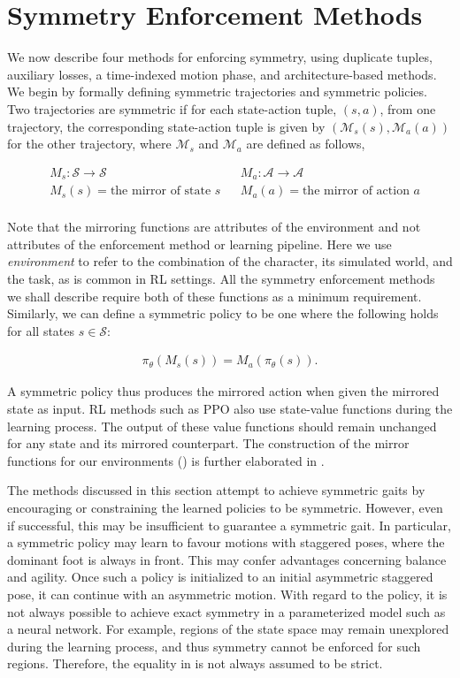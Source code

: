 \section{Symmetry Enforcement Methods}
\label{sec:methods}
We now describe four methods for enforcing symmetry, using duplicate tuples, auxiliary losses, 
a time-indexed motion phase, and architecture-based methods.  
We begin by formally defining symmetric trajectories and symmetric policies.  
Two trajectories are symmetric if for each state-action tuple, $(s,a)$, from one trajectory, 
the corresponding state-action tuple is given by $(\mathcal{M}_s(s), \mathcal{M}_a(a))$ 
for the other trajectory, where $\mathcal{M}_s$ and $\mathcal{M}_a$ are defined as follows,

\begin{align*}
    &M_s: \mathcal{S} \to \mathcal{S} &  &M_a: \mathcal{A} \to \mathcal{A}\\
    &M_s(s) = \text{the mirror of state } s & &M_a(a) = \text{the mirror of action } a\\
\end{align*}

Note that the mirroring functions are attributes of the environment and
not attributes of the enforcement method or learning pipeline.  Here we use {\em environment}
to refer to the combination of the character, its simulated world, and the task, as is common
in RL settings.
All the symmetry enforcement methods we shall describe
require both of these functions as a minimum requirement.  
Similarly, we can define a symmetric policy to be one where the following holds
for all states $s \in \mathcal{S}$:

\begin{align}
    \pi_\theta(M_s(s)) = M_a(\pi_\theta(s)).
    \label{eq:symmetric-policy}
\end{align}

A symmetric policy thus produces the mirrored action when given the mirrored state as input. 
RL methods such as PPO also use state-value functions during the learning process.  
The output of these value functions should remain unchanged for any state and its mirrored counterpart.  
The construction of the mirror functions for our environments () is further 
elaborated in .

The methods discussed in this section attempt to achieve symmetric gaits by encouraging or constraining 
the learned policies to be symmetric. However, even if successful, this may be insufficient to guarantee a symmetric gait.  
In particular, a symmetric policy may learn to favour motions with staggered poses, where the dominant foot is always in front.
This may confer advantages concerning balance and agility.  
Once  such a policy is initialized to an initial asymmetric staggered pose, it can continue
with an asymmetric motion.
With regard to the policy, it is not always possible to achieve exact symmetry in a parameterized model 
such as a neural network.  For example, regions of the state space may remain unexplored 
during the learning process, and thus symmetry cannot be enforced for such regions.  
Therefore, the equality in  is not always assumed to be strict.

